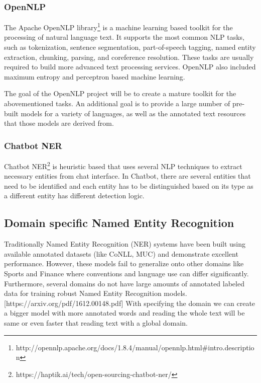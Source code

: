 \documentclass[thesis=M,english]{FITthesis}[2018/05/30]
\begin{document}
\subsubsection{OpenNLP}\label{OpenNLP}
The Apache OpenNLP library\footnote{http://opennlp.apache.org/docs/1.8.4/manual/opennlp.html\#intro.description} is a machine learning based toolkit for the processing of natural language text. It supports the most common NLP tasks, such as tokenization, sentence segmentation, part-of-speech tagging, named entity extraction, chunking, parsing, and coreference resolution. These tasks are usually required to build more advanced text processing services. OpenNLP also included maximum entropy and perceptron based machine learning.

The goal of the OpenNLP project will be to create a mature toolkit for the abovementioned tasks. An additional goal is to provide a large number of pre-built models for a variety of languages, as well as the annotated text resources that those models are derived from.

\subsubsection{Chatbot NER}\label{Chatbot NER}
Chatbot NER\footnote{https://haptik.ai/tech/open-sourcing-chatbot-ner/} is heuristic based that uses several NLP techniques to extract necessary entities from chat interface. In Chatbot, there are several entities that need to be identified and each entity has to be distinguished based on its type as a different entity has different detection logic. 

\subsection{Domain specific Named Entity Recognition}
Traditionally Named Entity Recognition (NER) systems have been built using available annotated datasets (like CoNLL, MUC) and demonstrate excellent performance. However, these models fail to generalize onto other domains like Sports and Finance where conventions and language use can differ significantly. Furthermore, several domains do not have large amounts of annotated labeled data for training robust Named Entity Recognition models. [https://arxiv.org/pdf/1612.00148.pdf]
With specifying the domain we can create a bigger model with more annotated words and reading the whole text will be same or even faster that reading text with a global domain.  
\end{document}
